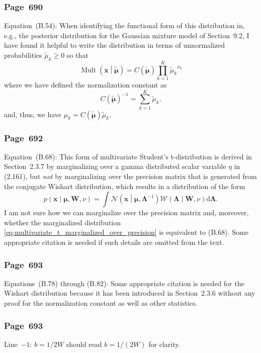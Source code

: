 \documentclass[12pt,a4paper]{article}
\newcommand{\erratum}[1]{\subsubsection*{#1}}
\begin{document}
\erratum{Page~690}
Equation~(B.54):
When identifying the functional form of this distribution in,
e.g., the posterior distribution for the Gaussian mixture model of Section~9.2,
I have found it helpful to write the distribution in terms of unnormalized probabilities
$\tilde{\mu}_k \geq 0$ so that
\begin{equation}
\operatorname{Mult}\left(\mathbf{x}\middle|\tilde{\bm{\mu}}\right) =
  C(\tilde{\bm{\mu}}) \prod_{k=1}^{K} {\tilde{\mu}_k}^{x_k}
\end{equation}
where we have defined the normalization constant as
\begin{equation}
{C(\tilde{\bm{\mu}})}^{-1} = \sum_{k=1}^{K} \tilde{\mu}_k .
\end{equation}
and, thus, we have $\mu_k = C(\tilde{\bm{\mu}}) \tilde{\mu}_k$.

\erratum{Page~692}
Equation~(B.68):
This form of multivariate Student's t-distribution is derived in Section~2.3.7
by marginalizing over a gamma distributed scalar variable $\eta$ in (2.161),
but \emph{not} by marginalizing over the precision matrix that is generated from
the conjugate Wishart distribution, which results in a distribution of the form
\begin{equation}
p\left(\mathbf{x}\middle|\bm{\mu}, \mathbf{W}, \nu\right) =
  \int \mathcal{N}\left(\mathbf{x}\middle|\bm{\mu}, \bm{\Lambda}^{-1}\right)
    \mathcal{W}\left(\bm{\Lambda}\middle|\mathbf{W}, \nu\right) \mathrm{d}\bm{\Lambda} .
\label{eq:multivariate_t_marginalized_over_precision}
\end{equation}
I am not sure how we can marginalize over the precision matrix and, moreover,
whether the marginalized distribution \eqref{eq:multivariate_t_marginalized_over_precision} is
equivalent to (B.68).
Some appropriate citation is needed if such details are omitted from the text.

\erratum{Page~693}
Equations~(B.78) through (B.82):
Some appropriate citation is needed for the Wishart distribution
because it has been introduced in Section~2.3.6 without any proof for
the normalization constant as well as other statistics.

\erratum{Page~693}
Line~$-1$: $b = 1/2W$ should read $b = 1/(2W)$ for clarity.
\end{document}
